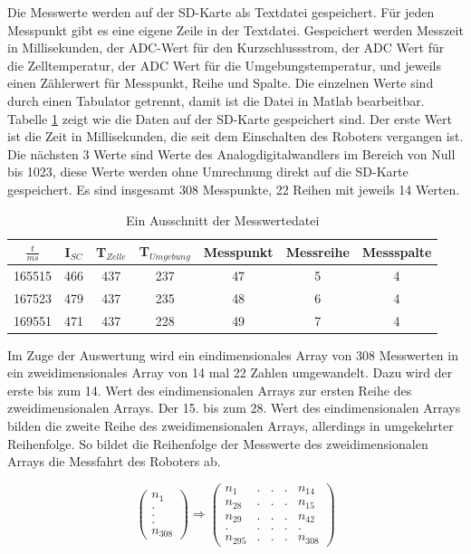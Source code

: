 \documentclass[a4paper,bibtotoc,oneside]{scrbook}
\begin{document}
Die Messwerte werden auf der SD-Karte als Textdatei gespeichert. Für jeden Messpunkt gibt es eine eigene Zeile in der Textdatei. Gespeichert werden Messzeit in Millisekunden, der ADC-Wert für den Kurzschlussstrom, der ADC Wert für die Zelltemperatur, der ADC Wert für die Umgebungstemperatur, und jeweils einen Zählerwert für Messpunkt, Reihe und Spalte. Die einzelnen Werte sind durch einen Tabulator getrennt, damit ist die Datei in Matlab bearbeitbar.  
Tabelle \ref{TabSD} zeigt wie die Daten auf der SD-Karte gespeichert sind. Der erste Wert ist die Zeit in Millisekunden, die seit dem Einschalten des Roboters vergangen ist. Die nächsten 3 Werte sind Werte des Analogdigitalwandlers im Bereich von Null bis 1023, diese Werte werden ohne Umrechnung direkt auf die SD-Karte gespeichert. Es sind insgesamt 308 Messpunkte, 22 Reihen mit jeweils 14 Werten.  

 
\begin{table}[htbp]
\centering
\begin{tabular}{ | c | c | c | c | c | c | c | } 
\hline
$\frac{t}{ms}$ & I$_{SC}$ & T$_{Zelle}$ & T$_{Umgebung}$ & Messpunkt & Messreihe & Messspalte \\
\hline
\hline
{165515} & {466} & {437} & {237} & {47} & {5} & {4} \\
\hline
{167523} & {479} & {437} & {235} & {48} & {6} & {4} \\
\hline
{169551} & {471} & {437} & {228} & {49} & {7} & {4} \\
\hline
\end{tabular}
\caption{Ein Ausschnitt der Messwertedatei}\label{TabSD}
\end{table}

Im Zuge der Auswertung wird ein eindimensionales Array von 308 Messwerten in ein zweidimensionales Array von 14 mal 22 Zahlen umgewandelt. Dazu wird der erste bis zum 14. Wert des eindimensionalen Arrays zur ersten Reihe des zweidimensionalen Arrays. Der 15. bis zum 28. Wert des eindimensionalen Arrays bilden die zweite Reihe des zweidimensionalen Arrays, allerdings in umgekehrter Reihenfolge. So bildet die Reihenfolge der Messwerte des zweidimensionalen Arrays die Messfahrt des Roboters ab.
\newline

\begin{equation}
\begin{pmatrix}
n_1 \\ . \\ . \\ . \\ n_{308} 
\end{pmatrix}
\Longrightarrow
\begin{pmatrix}
n_{1}  & . &.& .& n_{14} \\
n_{28} & .& .& . &n_{15}  \\
n_{29}  &. &.& .& n_{42}  \\
. &.& .& . & . \\
n_{295}  &.& .&.& n_{308} 
\end{pmatrix}
\end{equation}
\end{document}
